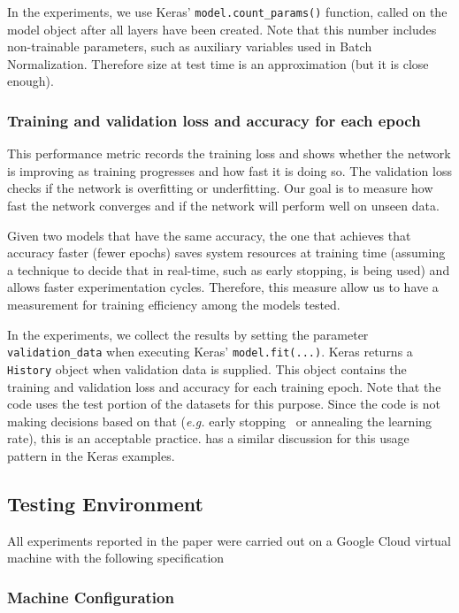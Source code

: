 \documentclass[../dropout-vs-batch-normalization.tex]{subfiles}
\begin{document}
In the experiments, we use Keras' \verb|model.count_params()| function, called on the model object after all layers have been created. Note that this number includes non-trainable parameters, such as auxiliary variables used in Batch Normalization. Therefore size at test time is an approximation (but it is close enough).

\medskip
\subsubsection{Training and validation loss and accuracy for each epoch}

This performance metric records the training loss and shows whether the network is improving as training progresses and how fast it is doing so. The validation loss checks if the network is overfitting or underfitting. Our goal is to measure how fast the network converges and if the network will perform well on unseen data.

Given two models that have the same accuracy, the one that achieves that accuracy faster (fewer epochs) saves system resources at training time (assuming a technique to decide that in real-time, such as early stopping, is being used) and allows faster experimentation cycles. Therefore, this measure allow us to have a measurement for training efficiency among the models tested.

In the experiments, we collect the results by setting the parameter \verb|validation_data| when executing Keras' \verb|model.fit(...)|. Keras returns a \verb|History| object when validation data is supplied. This object contains the training and validation loss and accuracy for each training epoch. Note that the code uses the test portion of the datasets for this purpose. Since the code is not making decisions based on that (\textit{e.g.} early stopping~\cite{Morgan1989} or annealing the learning rate), this is an acceptable practice. \cite{KerasTeam2016} has a similar discussion for this usage pattern in the Keras examples.

\subsection{Testing Environment}

All experiments reported in the paper were carried out on a Google Cloud virtual machine with the following specification

\medskip
\subsubsection{Machine Configuration}
\end{document}
